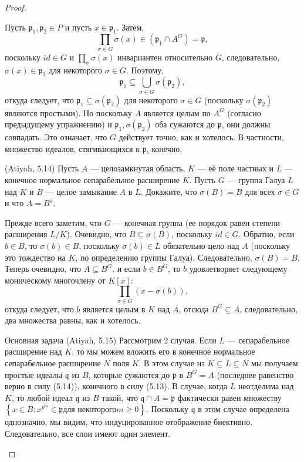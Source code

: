 \begin{proof}
\begin{itemize}
Пусть $\mathfrak{p}_1, \mathfrak{p}_2 \in P$ и пусть $x \in \mathfrak{p}_1$. Затем,
$$
\prod_{\sigma \in G} \sigma(x) \in\left(\mathfrak{p}_1 \cap A^G\right)=\mathfrak{p},
$$
поскольку $id \in G$ и $\prod_\sigma \sigma(x)$ инвариантен относительно $G$, следовательно, $\sigma(x) \in \mathfrak{p}_2$ для некоторого $\sigma \in G $. Поэтому,
$$
\mathfrak{p}_1 \subseteq \bigcup_{\sigma \in G} \sigma\left(\mathfrak{p}_2\right),
$$
откуда следует, что $\mathfrak{p}_1 \subseteq \sigma\left(\mathfrak{p}_2\right)$ для некоторого $\sigma \in G$ (поскольку $\sigma\left(\mathfrak{p }_2\right)$ являются простыми). Но поскольку $A$ является целым по $A^G$ (согласно предыдущему упражнению) и $\mathfrak{p}_1, \sigma\left(\mathfrak{p}_2\right)$ оба сужаются до $\mathfrak{p}$, они должны совпадать. Это означает, что $G$ действует точно, как и хотелось.
В частности, множество идеалов, стягивающихся к $\mathfrak{p}$, конечно.
\vskip 0.2in

(Atiyah, 5.14) Пусть $A$ — целозамкнутая область, $K$ — её поле частных и $L$ — конечное нормальное сепарабельное расширение $K$. Пусть $G$ — группа Галуа $L$ над $K$ и $B$ — целое замыкание $A$ в $L$. Докажите, что $\sigma(B)=B$ для всех $\sigma \in G$ и что $A=B^a$.

Прежде всего заметим, что $G$ — конечная группа (ее порядок равен степени расширения $L/K$). Очевидно, что $B \subseteq \sigma(B)$, поскольку $id \in G$. Обратно, если $b \in B$, то $\sigma(b) \in B$, поскольку $\sigma(b) \in L$ обязательно цело над $A$ (поскольку это тождество на $K$, по определению группы Галуа). Следовательно, $\sigma(B)=B$.
Теперь очевидно, что $A \subseteq B^G$, и если $b \in B^G$, то $b$ удовлетворяет следующему моническому многочлену от $K[x]$:
$$
\prod_{\sigma \in G}(x-\sigma(b)),
$$
откуда следует, что $b$ является целым в $K$ над $A$, отсюда $B^G \subseteq A$, следовательно, два множества равны, как и хотелось.
\vskip 0.2in

Основная задача (Atiyah, 5.15)
Рассмотрим 2 случая. Если $L$ — сепарабельное расширение над $K$, то мы можем вложить его в конечное нормальное сепарабельное расширение $N$ поля $K$. В этом случае из $K \subseteq L \subseteq N$ мы получаем простые идеалы $\mathfrak{q}$ из $B$, которые сужаются до $\mathfrak{p}$ в $B^G = A$ (последнее равенство верно в силу (5.14)), конечного в силу (5.13). В случае, когда $L$ неотделима над $K$, то любой идеал $\mathfrak{q}$ из $B$ такой, что $\mathfrak{q} \cap A=\mathfrak{p}$ фактически равен множеству $\left\{x \in B: x^{p^m} \in \mathfrak{p} \text{для некоторого} m \geq 0\right\}$. Поскольку $\mathfrak{q}$ в этом случае определена однозначно, мы видим, что индуцированное отображение биективно. Следовательно, все слои имеют один элемент.
\end{itemize}
\end{proof}
\begin{comment}
https://math.stackexchange.com/questions/1108108/whats-the-real-reason-a-finite-map-has-finite-fibers
\end{comment}
\vskip 0.6in





